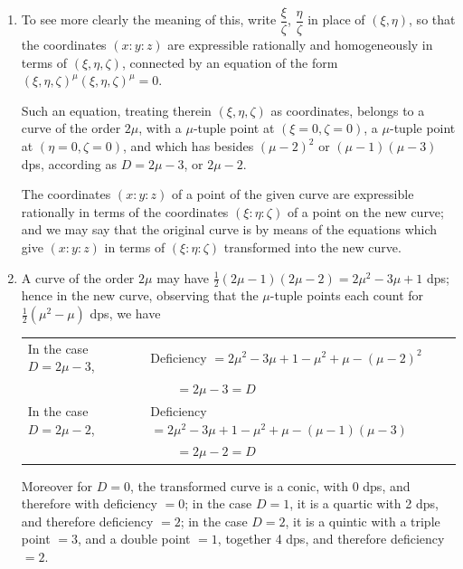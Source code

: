 \documentclass[12pt,a4paper]{article}
\theoremstyle{plain}
\theoremstyle{definition}
\theoremstyle{remark}
\begin{document}
\begin{enumerate}[label=\arabic*.]
$D$ even, $= 2\mu - 2$, the equation is $(1,\xi)^\mu(1,\eta)^{\mu-1} = 0$, and is besides such, that treating $(\xi, \eta)$ as Cartesian coordinates, the curve thereby represented has $(\mu-1)(\mu-3)$ dps.

\item To see more clearly the meaning of this, write $\dfrac{\xi}{\zeta}$, $\dfrac{\eta}{\zeta}$ in place of $(\xi, \eta)$, so that the coordinates $(x:y:z)$ are expressible rationally and homogeneously in terms of $(\xi, \eta, \zeta)$, connected by an equation of the form $(\xi, \eta, \zeta)^\mu(\xi, \eta, \zeta)^\mu = 0$.

Such an equation, treating therein $(\xi, \eta, \zeta)$ as coordinates, belongs to a curve of the order $2\mu$, with a $\mu$-tuple point at $(\xi=0, \zeta=0)$, a $\mu$-tuple point at $(\eta=0, \zeta=0)$, and which has besides $(\mu-2)^2$ or $(\mu-1)(\mu-3)$ dps, according as $D = 2\mu - 3$, or $2\mu - 2$.

The coordinates $(x:y:z)$ of a point of the given curve are expressible rationally in terms of the coordinates $(\xi:\eta:\zeta)$ of a point on the new curve; and we may say that the original curve is by means of the equations which give $(x:y:z)$ in terms of $(\xi:\eta:\zeta)$ transformed into the new curve.

\item A curve of the order $2\mu$ may have $\frac{1}{2}(2\mu-1)(2\mu-2) = 2\mu^2 - 3\mu + 1$ dps; hence in the new curve, observing that the $\mu$-tuple points each count for $\frac{1}{2}(\mu^2 - \mu)$ dps, we have

\smallskip
\hspace*{2em}\begin{tabular}{@{}l@{\quad}l@{}}
In the case $D = 2\mu - 3$, & Deficiency $= 2\mu^2 - 3\mu + 1 - \mu^2 + \mu - (\mu-2)^2$ \\
& $\qquad = 2\mu - 3 = D$ \\
In the case $D = 2\mu - 2$, & Deficiency $= 2\mu^2 - 3\mu + 1 - \mu^2 + \mu - (\mu-1)(\mu-3)$ \\
& $\qquad = 2\mu - 2 = D$
\end{tabular}
\smallskip

Moreover for $D=0$, the transformed curve is a conic, with 0 dps, and therefore with deficiency $= 0$; in the case $D=1$, it is a quartic with 2 dps, and therefore deficiency $= 2$; in the case $D=2$, it is a quintic with a triple point $= 3$, and a double point $= 1$, together 4 dps, and therefore deficiency $= 2$.


\end{enumerate}
\end{document}
